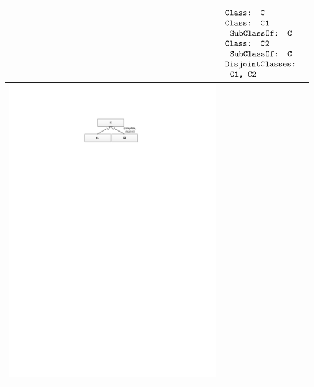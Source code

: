 \documentclass[11pt,final,onecolumn]{report}
\newcommand\umltablespacing{3cm}
\newcommand\dltablespacing{4.5cm}
\newcommand\owlspacing{-1mm}
\begin{document}
\begin{longtable}{|>{\scriptsize}c|>{\scriptsize}l|>{\scriptsize}l|}
\begin{minipage}{\dltablespacing}
    \end{minipage}
    &
      $\begin{aligned}
	  &\texttt{Class: C}\\[\owlspacing]
          &\texttt{Class: C1}\\[\owlspacing]
	  &\texttt{\hspace*{0.20cm}SubClassOf: C}\\[\owlspacing]
          &\texttt{Class: C2}\\[\owlspacing]
          &\texttt{\hspace*{0.20cm}SubClassOf: C}\\[\owlspacing]
          &\texttt{DisjointClasses:}\\[\owlspacing]
          &\texttt{\hspace*{0.20cm}C1, C2}
     \end{aligned}$
     \\\hline
    \begin{minipage}{\umltablespacing}
      \centering\hspace*{-5.5mm}\includegraphics[trim = 76mm 235mm 72mm 25mm, clip, scale=0.75]{./diagrams/chapter5/CompleteDisjoint}

\end{minipage}
\end{longtable}
\end{document}
